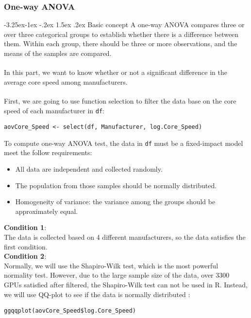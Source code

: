 \documentclass[a4paper]{article}
\makeatletter
\newcounter {subsubsubsection}[subsubsection]
\newcommand\subsubsubsection{\@startsection{subsubsubsection}{4}{\z@}%
                                     {-3.25ex\@plus -1ex \@minus -.2ex}%
                                     {1.5ex \@plus .2ex}%
                                     {\normalfont\normalsize\bfseries}}
\makeatother
\begin{document}
\subsubsection{One-way ANOVA}
\subsubsubsection{Basic concept}
A one-way ANOVA compares three or over three categorical groups to establish whether there is a difference between them. Within each group, there should be three or more observations, and the means of the samples are compared.\\\\
In this part, we want to know whether or not a significant difference in the average core speed among manufacturers.\\\\
First, we are going to use function selection to filter the data base on the core speed of each manufacturer in \verb|df|:
\begin{mdframed}[leftline=false,rightline=false,backgroundcolor=lightblue!10,nobreak=false]
    \begin{verbatim}
aovCore_Speed <- select(df, Manufacturer, log.Core_Speed)
    \end{verbatim}
\end{mdframed}
To compute one-way ANOVA test, the data in \verb|df| must be a fixed-impact model meet the follow requirements:
\begin{itemize}
\item All data are independent and collected randomly.
\item The population from those samples should be normally distributed.
\item Homogeneity of variance: the variance among the groups should be approximately equal.
\end{itemize}
\textbf{Condition 1}:\\
The data is collected based on 4 different manufacturers, so the data satisfies the first condition.\bigskip\\
\textbf{Condition 2}:\\
Normally, we will use the Shapiro-Wilk test, which is the most powerful normality test. However, due to the large sample size of the data, over 3300 GPUs satisfied after filtered, the Shapiro-Wilk test can not be used in R. Instead, we will use QQ-plot to see if the data is normally distributed \cite{bib11}:
\begin{mdframed}[leftline=false,rightline=false,backgroundcolor=lightblue!10,nobreak=false]
    \begin{verbatim}
ggqqplot(aovCore_Speed$log.Core_Speed)
    \end{verbatim}
\end{mdframed}
\end{document}
